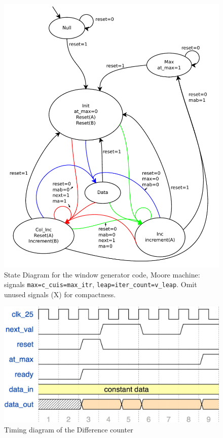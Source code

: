 \documentclass{article}
\begin{document}
\begin{figure}[h!]
  \centering
    \includegraphics[width=\textwidth]{state_diagrams/diff_window_gen.pdf}
  \caption{State Diagram for the window generator code, Moore machine:
    signals \texttt{max=c\_cuis=max\_itr},
    \texttt{leap=iter\_count=v\_leap}. Omit unused signals (X) for
    compactness.}
\end{figure}

\begin{figure}[h!]
  \centering
    \includegraphics[width=\textwidth]{timing_diagrams/diff_counter.pdf}
  \caption{Timing diagram of the Difference counter}
\end{figure}
\end{document}
